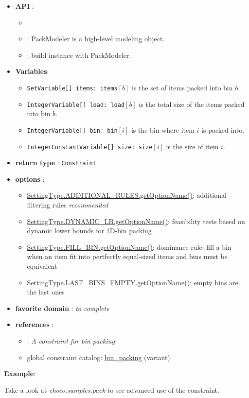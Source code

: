 \begin{itemize}
	\item \textbf{API} :
	\begin{itemize}
		\item {}
		\item {}: PackModeler is a high-level modeling object.
		\item {}: build instance with PackModeler.
	\end{itemize}
	\item \textbf{Variables}:
	\begin{itemize}
		\item \texttt{SetVariable[] items: items}$[b]$ is the set of items packed into bin $b$.
		\item \texttt{IntegerVariable[] load: load}$[b]$ is the total size of the items packed into bin $b$.
		\item \texttt{IntegerVariable[] bin: bin}$[i]$ is the bin where item $i$ is packed into.
		\item \texttt{IntegerConstantVariable[] size: size}$[i]$ is the size of item $i$.
	\end{itemize}
	\item \textbf{return type} : \texttt{Constraint}
	\item \textbf{options} : 	
      \begin{itemize}
      \item \hyperlink{cpackar:cpackaroptions}{SettingType.ADDITIONAL\_RULES.getOptionName()}: additional filtering rules \emph{recommended}
      \item \hyperlink{cpackdlb:cpackdlboptions}{SettingType.DYNAMIC\_LB.getOptionName()}: feasibility tests based on dynamic lower bounds for 1D-bin packing
      \item \hyperlink{cpackfill:cpackfilloptions}{SettingType.FILL\_BIN.getOptionName()}: dominance rule: fill a bin when an item fit into pertfectly equal-sized items and bins must be equivalent
      \item \hyperlink{cpacklbe:cpacklbeoptions}{SettingType.LAST\_BINS\_EMPTY.getOptionName()}: empty bins are the last ones 
      \end{itemize}
	\item \textbf{favorite domain} : \emph{to complete}
	\item \textbf{references} :
      \begin{itemize}
      \item \cite{ShawCP04}: \emph{A constraint for bin packing}
      \item global constraint catalog: \href{http://www.emn.fr/x-info/sdemasse/gccat/Cbin_packing.html}{bin\_packing} (variant)
      \end{itemize}
\end{itemize}

\textbf{Example}:

Take a look at \emph{choco.samples.pack} to see advanced use of the constraint.


